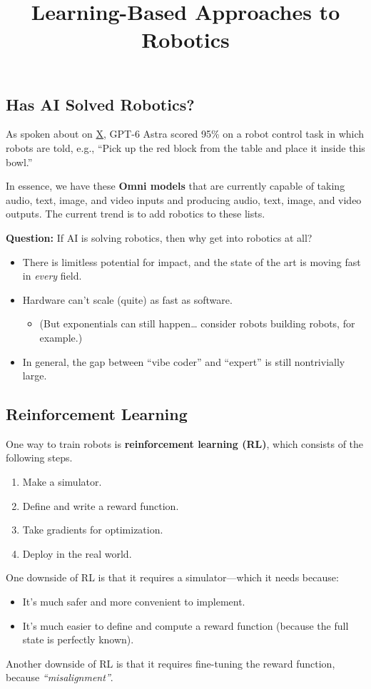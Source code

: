 \title{Learning-Based Approaches to Robotics}



\subsection{Has AI Solved Robotics?}

As spoken about on
\href{https://x.com/chooi_jeq/status/2096064315115839904}{X},
GPT-6 Astra scored 95\% on a robot control task
in which robots are told, e.g.,
``Pick up the red block from the table
and place it inside this bowl.''

In essence, we have these \textbf{Omni models}
that are currently capable of taking
audio, text, image, and video inputs
and producing audio, text, image, and video outputs.
The current trend is to add robotics to these lists.

\textbf{Question:}
If AI is solving robotics, then why get into robotics at all?
\begin{itemize}
    \item There is limitless potential for impact,
    and the state of the art is moving fast in \emph{every} field.
    \item Hardware can't scale (quite) as fast as software.
    \begin{itemize}
        \item (But exponentials can still happen\dots
        consider robots building robots, for example.)
    \end{itemize}
    \item In general, the gap between ``vibe coder'' and ``expert''
    is still nontrivially large.
\end{itemize}

\subsection{Reinforcement Learning}

One way to train robots is \textbf{reinforcement learning (RL)},
which consists of the following steps.
\begin{enumerate}
    \item Make a simulator.
    \item Define and write a reward function.
    \item Take gradients for optimization.
    \item Deploy in the real world.
\end{enumerate}
One downside of RL is that it requires a simulator---which it needs because:
\begin{itemize}
    \item It's much safer and more convenient to implement.
    \item It's much easier to define and compute a reward function
    (because the full state is perfectly known).
\end{itemize}
Another downside of RL is that it requires fine-tuning
the reward function, because \emph{``misalignment''}.

